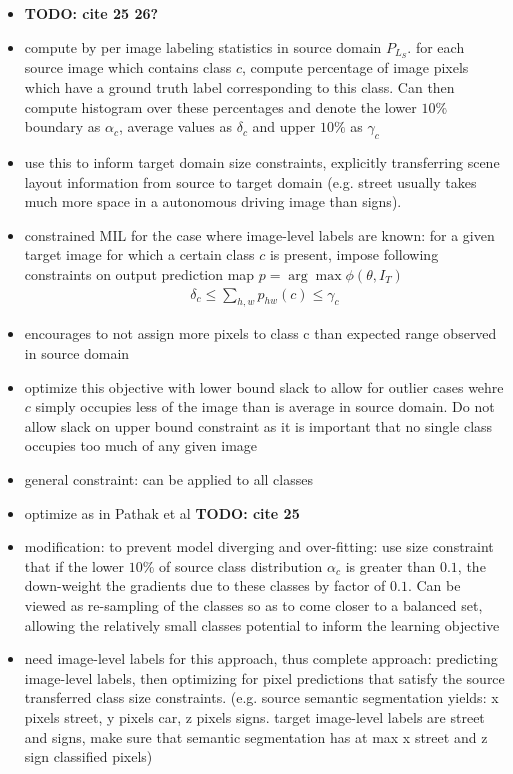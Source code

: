 \documentclass[]{article}
\newcommand{\todo}[1]{{\color{red}\bf{TODO: #1}}}
\begin{document}
\begin{itemize}
	\item \todo{cite 25 26?}
	\item compute by per image labeling statistics in source domain $P_{L_S}$. for each source image which contains class $c$, compute percentage of image pixels which have a ground truth label corresponding to this class. Can then compute histogram over these percentages and denote the lower $10\%$ boundary as $\alpha_c$, average values as $\delta_c$ and upper $10\%$ as $\gamma_c$
	\item use this to inform target domain size constraints, explicitly transferring scene layout information from source to target domain (e.g. street usually takes much more space in a autonomous driving image than signs).
	\item constrained MIL for the case where image-level labels are known: for a given target image for which a certain class $c$ is present, impose following constraints on output prediction map $p = \arg \max \phi (\theta, I_T)$
	\begin{align}
		\delta_c \leq \sum_{h,w} p_{hw}(c) \leq \gamma_c
	\end{align}
	\item encourages to not assign more pixels to class c than expected range observed in source domain
	\item optimize this objective with lower bound slack to allow for outlier cases wehre $c$ simply occupies less of the image than is average in source domain. Do not allow slack on upper bound constraint as it is important that no single class occupies too much of any given image
	\item general constraint: can be applied to all classes 
	\item optimize as in Pathak et al \todo{cite 25}
	\item modification: to prevent model diverging and over-fitting: use size constraint that if the lower $10\%$ of source class distribution $\alpha_c$ is greater than $0.1$, the down-weight the gradients due to these classes by factor of $0.1$. Can be viewed as re-sampling of the classes so as to come closer to a balanced set, allowing the relatively small classes potential to inform the learning objective
	\item need image-level labels for this approach, thus complete approach: predicting image-level labels, then optimizing for pixel predictions that satisfy the source transferred class size constraints. (e.g. source semantic segmentation yields: x pixels street, y pixels car, z pixels signs. target image-level labels are street and signs, make sure that semantic segmentation has at max x street and z sign classified pixels)

\end{itemize}
\end{document}
